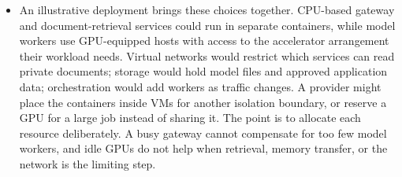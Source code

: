 \documentclass[10pt]{article}
\begin{document}
\begin{itemize}[leftmargin=1.25em, itemsep=0.3em, parsep=0pt, topsep=0pt]
    \item An illustrative deployment brings these choices together. CPU-based gateway and document-retrieval services could run in separate containers, while model workers use GPU-equipped hosts with access to the accelerator arrangement their workload needs. Virtual networks would restrict which services can read private documents; storage would hold model files and approved application data; orchestration would add workers as traffic changes. A provider might place the containers inside VMs for another isolation boundary, or reserve a GPU for a large job instead of sharing it. The point is to allocate each resource deliberately. A busy gateway cannot compensate for too few model workers, and idle GPUs do not help when retrieval, memory transfer, or the network is the limiting step.
\end{itemize}

\end{document}
